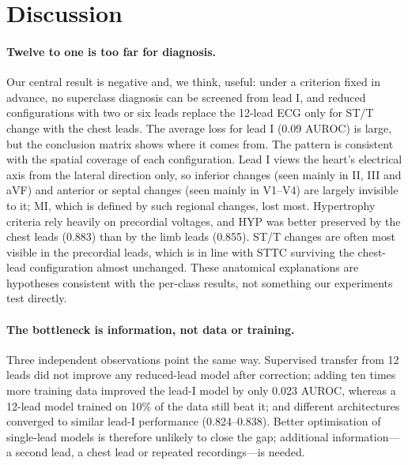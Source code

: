 \section{Discussion}
\label{sec:discussion}

\paragraph{Twelve to one is too far for diagnosis.} Our central result is negative and, we think, useful: under a criterion fixed in advance, no superclass diagnosis can be screened from lead I, and reduced configurations with two or six leads replace the 12-lead ECG only for ST/T change with the chest leads. The average loss for lead I (0.09 AUROC) is large, but the conclusion matrix shows where it comes from. The pattern is consistent with the spatial coverage of each configuration. Lead I views the heart's electrical axis from the lateral direction only, so inferior changes (seen mainly in II, III and aVF) and anterior or septal changes (seen mainly in V1--V4) are largely invisible to it; MI, which is defined by such regional changes, lost most. Hypertrophy criteria rely heavily on precordial voltages, and HYP was better preserved by the chest leads (0.883) than by the limb leads (0.855). ST/T changes are often most visible in the precordial leads, which is in line with STTC surviving the chest-lead configuration almost unchanged. These anatomical explanations are hypotheses consistent with the per-class results, not something our experiments test directly.

\paragraph{The bottleneck is information, not data or training.} Three independent observations point the same way. Supervised transfer from 12 leads did not improve any reduced-lead model after correction; adding ten times more training data improved the lead-I model by only 0.023 AUROC, whereas a 12-lead model trained on 10\% of the data still beat it; and different architectures converged to similar lead-I performance (0.824--0.838). Better optimisation of single-lead models is therefore unlikely to close the gap; additional information---a second lead, a chest lead or repeated recordings---is needed.

